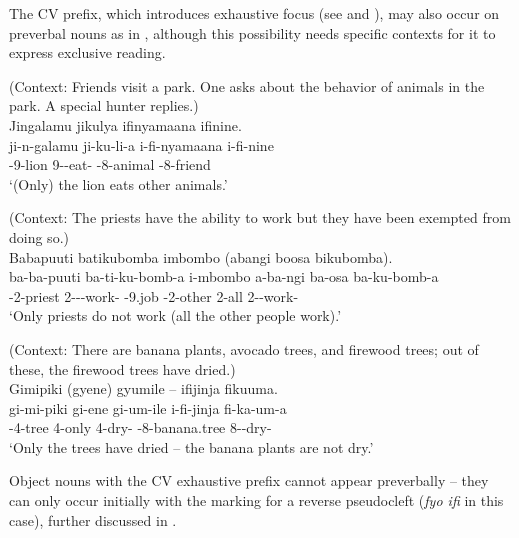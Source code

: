 \documentclass[output=paper]{langscibook}
\begin{document}
The CV prefix, which introduces exhaustive focus (see  and \citealt{vanderWalLusekelo2022}), may also occur on preverbal nouns as in , although this possibility needs specific contexts for it to express exclusive reading.

\ea
\label{bkm:Ref122598796}
(Context: Friends visit a park. One asks about the behavior of animals in the park. A special hunter replies.)\\
Jingalamu jikulya ifinyamaana ifinine.\\
\gll
ji-n-galamu  ji-ku-li-a  i-fi-nyamaana  i-fi-nine\\
\EXH{}-9-lion  9\SM{}-\PRS{}-eat-\FV{}  \AUG{}-8-animal  \AUG{}-8-friend\\
\glt
‘(Only) the lion eats other animals.’\\

\z


\ea
(Context: The priests have the ability to work but they have been exempted from doing so.)\\
Babapuuti batikubomba imbombo (abangi boosa bikubomba).\\
\gll
ba-ba-puuti  ba-ti-ku-bomb-a  i-mbombo a-ba-ngi  ba-osa  ba-ku-bomb-a\\
\EXH{}-2-priest  2\SM-\NEG-\PRS{}-work-\FV{}  \AUG{}-9.job  \AUG{}-2-other  2-all  2\SM-\PRS{}-work-\FV{}\\
\glt ‘Only priests do not work (all the other people work).’

\z

\ea
\label{bkm:Ref123743341}
(Context: There are banana plants, avocado trees, and firewood trees; out of these, the firewood trees have dried.)\\
Gimipiki (gyene) gyumile -- ifijinja fikuuma.\\
\gll
gi-mi-piki  gi-ene  gi-um-ile  i-fi-jinja  fi-ka-um-a\\
\EXH{}-4-tree  4-only  4\SM{}-dry-\PFV{}  \AUG{}-8-banana.tree  8\SM-\NEG{}-dry-\FV{}\\
\glt ‘Only the trees have dried -- the banana plants are not dry.’

\z


Object nouns with the CV exhaustive prefix cannot appear preverbally  – they can only occur initially with the marking for a reverse pseudocleft (\textit{fyo ifi} in this case), further discussed in .
\end{document}

